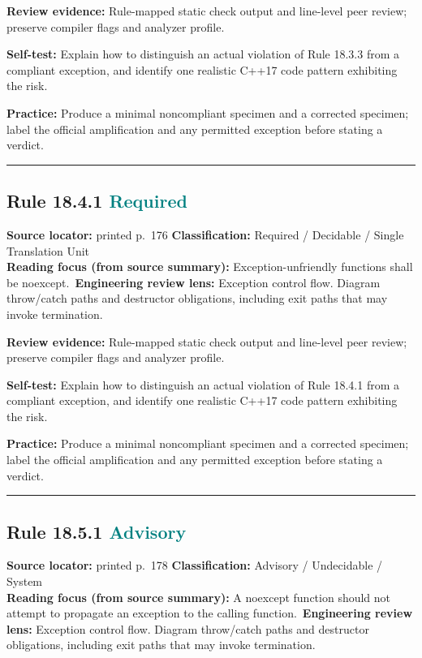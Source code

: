 \documentclass[10pt,letterpaper]{article}
\begin{document}
\textbf{Review evidence:} Rule-mapped static check output and line-level peer review; preserve compiler flags and analyzer profile.

\textbf{Self-test:} Explain how to distinguish an actual violation of Rule 18.3.3 from a compliant exception, and identify one realistic C++17 code pattern exhibiting the risk.\par
\textbf{Practice:} Produce a minimal noncompliant specimen and a corrected specimen; label the official amplification and any permitted exception before stating a verdict.
\smallskip\hrule\smallskip
\subsection*{Rule 18.4.1 \enspace \texorpdfstring{\small\textcolor{teal}{Required}}{Required}}
\noindent\textbf{Source locator:} printed p.~176 \quad\textbf{Classification:} Required / Decidable / Single Translation Unit\\
\textbf{Reading focus (from source summary):} Exception-unfriendly functions shall be noexcept.\
\textbf{Engineering review lens:} Exception control flow. Diagram throw/catch paths and destructor obligations, including exit paths that may invoke termination.

\textbf{Review evidence:} Rule-mapped static check output and line-level peer review; preserve compiler flags and analyzer profile.

\textbf{Self-test:} Explain how to distinguish an actual violation of Rule 18.4.1 from a compliant exception, and identify one realistic C++17 code pattern exhibiting the risk.\par
\textbf{Practice:} Produce a minimal noncompliant specimen and a corrected specimen; label the official amplification and any permitted exception before stating a verdict.
\smallskip\hrule\smallskip
\subsection*{Rule 18.5.1 \enspace \texorpdfstring{\small\textcolor{teal}{Advisory}}{Advisory}}
\noindent\textbf{Source locator:} printed p.~178 \quad\textbf{Classification:} Advisory / Undecidable / System\\
\textbf{Reading focus (from source summary):} A noexcept function should not attempt to propagate an exception to the calling function.\
\textbf{Engineering review lens:} Exception control flow. Diagram throw/catch paths and destructor obligations, including exit paths that may invoke termination.
\end{document}
